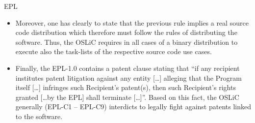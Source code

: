 \begin{license}{EPL}
\begin{itemize}
  \item Moreover, one has clearly to state that the previous rule implies a real
    source code distribution which therefore must follow the rules of
    distributing the software. Thus, the OSLiC requires in all cases of a binary 
    distribution to execute also the task-lists of the respective source code
    use cases. 
 
 	\item Finally, the EPL-1.0 contains a patent clause stating that \enquote{if
 	any recipient institutes patent litigation against any entity [\ldots]
 	alleging that the Program itself [\ldots] infringes such Recipient's
 	patent(s), then such Recipient's rights granted [\ldots by the EPL] shall
 	terminate [\ldots]}. Based on this fact, the OSLiC generally
 	(EPL-C1 -- EPL-C9) interdicts to legally fight against patents linked to the software.
\end{itemize}
\end{license}

%

